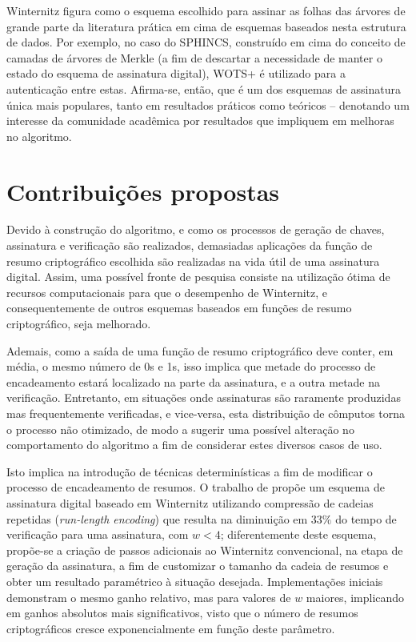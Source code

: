 \documentclass[12pt]{article}
\begin{document}
Winternitz figura como o esquema escolhido para assinar as folhas das
árvores de grande parte da literatura prática em cima de esquemas baseados
nesta estrutura de dados. Por exemplo, no caso do SPHINCS, construído em
cima do conceito de camadas de árvores de Merkle (a fim de descartar a
necessidade de manter o estado do esquema de assinatura digital), WOTS+ é
utilizado para a autenticação entre estas. Afirma-se, então, que é um
dos esquemas de assinatura única mais populares, tanto em resultados
práticos como teóricos -- denotando um interesse da comunidade acadêmica
por resultados que impliquem em melhoras no algoritmo.

\section{Contribuições propostas}

Devido à construção do algoritmo, e como os processos de geração de chaves,
assinatura e verificação são realizados, demasiadas aplicações da função
de resumo criptográfico escolhida são realizadas na vida útil de uma
assinatura digital. Assim, uma possível fronte de pesquisa consiste na
utilização ótima de recursos computacionais para que o desempenho de
Winternitz, e consequentemente de outros esquemas baseados em funções de
resumo criptográfico, seja melhorado.

Ademais, como a saída de uma função de resumo criptográfico deve conter,
em média, o mesmo número de 0s e 1s, isso implica que metade do processo
de encadeamento estará localizado na parte da assinatura, e a outra
metade na verificação. Entretanto, em situações onde assinaturas são
raramente produzidas mas frequentemente verificadas, e vice-versa, esta
distribuição de cômputos torna o processo não otimizado, de modo a
sugerir uma possível alteração no comportamento do algoritmo a fim de
considerar estes diversos casos de uso.

Isto implica na introdução de técnicas determinísticas a fim de
modificar o processo de encadeamento de resumos. O trabalho de
\cite{Steinwandt:2008:OSU:1412758.1412979} propõe um esquema de
assinatura digital baseado em Winternitz utilizando compressão de
cadeias repetidas (\emph{run-length encoding}) que resulta na
diminuição em $33\%$ do tempo de verificação para uma assinatura,
com $w < 4$; diferentemente deste esquema, propõe-se a criação
de passos adicionais ao Winternitz convencional, na etapa de
geração da assinatura, a fim de customizar o tamanho da cadeia de
resumos e obter um resultado paramétrico à situação desejada.
Implementações iniciais demonstram o mesmo ganho relativo, mas
para valores de $w$ maiores, implicando em ganhos absolutos mais
significativos, visto que o número de resumos criptográficos
cresce exponencialmente em função deste parâmetro.



\end{document}
